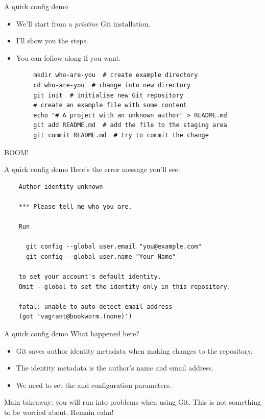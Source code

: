 \begin{frame}[fragile]{A quick config demo}
    \begin{itemize}
        \item We'll start from a \emph{pristine} Git installation.
        \item I'll show you the steps.
        \item You can follow along if you want.
    \end{itemize}
    \begin{verbatim}
        mkdir who-are-you  # create example directory
        cd who-are-you  # change into new directory
        git init  # initialise new Git repository
        # create an example file with some content
        echo "# A project with an unknown author" > README.md
        git add README.md  # add the file to the staging area
        git commit README.md  # try to commit the change
    \end{verbatim}
    BOOM!  
\end{frame}

\begin{frame}[fragile]{A quick config demo}
    Here's the error message you'll see:
    \begin{verbatim}
    Author identity unknown

    *** Please tell me who you are.

    Run

      git config --global user.email "you@example.com"
      git config --global user.name "Your Name"

    to set your account's default identity.
    Omit --global to set the identity only in this repository.

    fatal: unable to auto-detect email address
    (got 'vagrant@bookworm.(none)')
    \end{verbatim}
\end{frame}

\begin{frame}[fragile]{A quick config demo}
    What happened here?

    \begin{itemize}
        \item Git saves author identity metadata when making changes to the
            repository.
        \item The identity metadata is the author's name and email address.
        \item We need to set the  and 
            configuration parameters.
    \end{itemize}

    Main takeaway: you will run into problems when using Git.  This is not
    something to be worried about.  Remain calm!
\end{frame}

